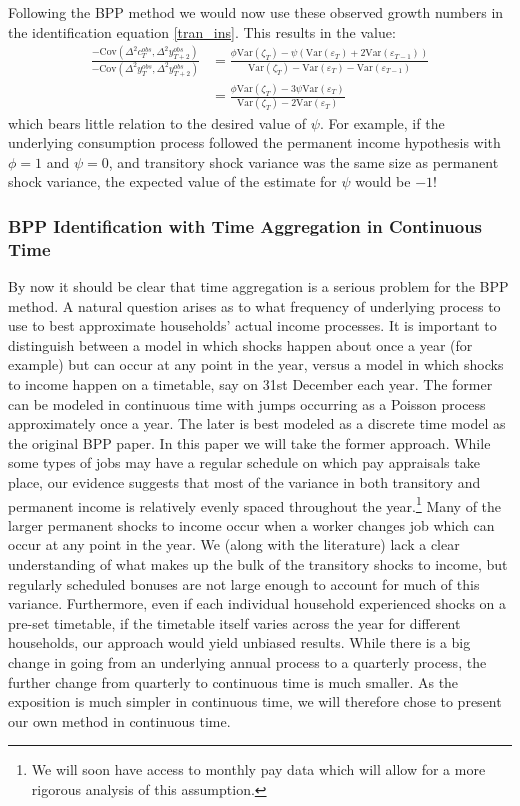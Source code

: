 \documentclass[titlepage]{\econtex}\newcommand{\texname}{IncomeUncertainty}
\begin{document}
Following the BPP method we would now use these observed growth numbers in the identification equation \ref{tran_ins}. This results in the value:
\begin{align}
\frac{-\mathrm{Cov}(\Delta^2 c^{obs}_T,\Delta^2 y^{obs}_{T+2})}{-\mathrm{Cov}(\Delta^2 y^{obs}_T,\Delta^2 y^{obs}_{T+2})} &= \frac{\phi \mathrm{Var}(\zeta_T) -\psi(\mathrm{Var}(\varepsilon_T) + 2\mathrm{Var}(\varepsilon_{T-1}) )}{ \mathrm{Var}(\zeta_T) - \mathrm{Var}(\varepsilon_T) -\mathrm{Var}(\varepsilon_{T-1}) } \nonumber\\
& = \frac{\phi \mathrm{Var}(\zeta_T) -3\psi \mathrm{Var}(\varepsilon_T)  }{ \mathrm{Var}(\zeta_T) - 2\mathrm{Var}(\varepsilon_T)  }	\label{psihat}
\end{align}
which bears little relation to the desired value of $\psi$. For example, if the underlying consumption process followed the permanent income hypothesis with $\phi=1$ and $\psi=0$, and transitory shock variance was the same size as permanent shock variance, the expected value of the estimate for $\psi$ would be $-1$!

\subsubsection{BPP Identification with Time Aggregation in Continuous Time} \label{BPP_cont}
By now it should be clear that time aggregation is a serious problem for the BPP method. A natural question arises as to what frequency of underlying process to use to best approximate households' actual income processes. It is important to distinguish between a model in which shocks happen about once a year (for example) but can occur at any point in the year, versus a model in which shocks to income happen on a timetable, say on 31st December each year. The former can be modeled in continuous time with jumps occurring as a Poisson process approximately once a year. The later is best modeled as a discrete time model as the original BPP paper. In this paper we will take the former approach. While some types of jobs may have a regular schedule on which pay appraisals take place, our evidence suggests that most of the variance in both transitory and permanent income is relatively evenly spaced throughout the year.\footnote{We will soon have access to monthly pay data which will allow for a more rigorous analysis of this assumption.} Many of the larger permanent shocks to income occur when a worker changes job which can occur at any point in the year. We (along with the literature) lack a clear understanding of what makes up the bulk of the transitory shocks to income, but regularly scheduled bonuses are not large enough to account for much of this variance. Furthermore, even if each individual household experienced shocks on a pre-set timetable, if the timetable itself varies across the year for different households, our approach would yield unbiased results. While there is a big change in going from an underlying annual process to a quarterly process, the further change from quarterly to continuous time is much smaller. As the exposition is much simpler in continuous time, we will therefore chose to present our own method in continuous time.
\end{document}
